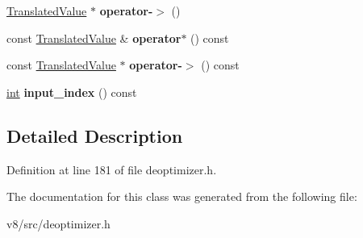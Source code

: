 \begin{DoxyCompactItemize}
\item 
\mbox{\label{classv8_1_1internal_1_1TranslatedFrame_1_1iterator_ad1f854144336e0d2e5a7c41c38ba31f2}} 
\mbox{\hyperlink{classv8_1_1internal_1_1TranslatedValue}{Translated\+Value}} $\ast$ {\bfseries operator-\/$>$} ()
\item 
\mbox{\label{classv8_1_1internal_1_1TranslatedFrame_1_1iterator_a403a1b058a32ac37bbb9e4eddbc75b53}} 
const \mbox{\hyperlink{classv8_1_1internal_1_1TranslatedValue}{Translated\+Value}} \& {\bfseries operator$\ast$} () const
\item 
\mbox{\label{classv8_1_1internal_1_1TranslatedFrame_1_1iterator_a33c3afcd5a7ff3a18fc80ae0f7b880a2}} 
const \mbox{\hyperlink{classv8_1_1internal_1_1TranslatedValue}{Translated\+Value}} $\ast$ {\bfseries operator-\/$>$} () const
\item 
\mbox{\label{classv8_1_1internal_1_1TranslatedFrame_1_1iterator_afe02cc68218f2bf3b39bee88931738c8}} 
\mbox{\hyperlink{classint}{int}} {\bfseries input\+\_\+index} () const
\end{DoxyCompactItemize}


\subsection{Detailed Description}


Definition at line 181 of file deoptimizer.\+h.



The documentation for this class was generated from the following file\+:\begin{DoxyCompactItemize}
\item 
v8/src/deoptimizer.\+h\end{DoxyCompactItemize}

